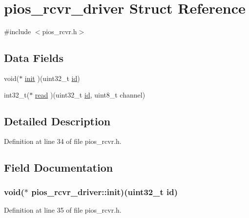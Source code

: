 \hypertarget{structpios__rcvr__driver}{\section{pios\-\_\-rcvr\-\_\-driver \-Struct \-Reference}
\label{structpios__rcvr__driver}
}


{\ttfamily \#include $<$pios\-\_\-rcvr.\-h$>$}

\subsection*{\-Data \-Fields}
\begin{DoxyCompactItemize}
\item 
void($\ast$ \hyperlink{structpios__rcvr__driver_a9408f58f021157271f50346eb77b4e6c}{init} )(uint32\-\_\-t \hyperlink{uavobjectmanager_8c_abaabdc509cdaba7df9f56c6c76f3ae19}{id})
\item 
int32\-\_\-t($\ast$ \hyperlink{structpios__rcvr__driver_aece490b76542b52a499fe333f933372e}{read} )(uint32\-\_\-t \hyperlink{uavobjectmanager_8c_abaabdc509cdaba7df9f56c6c76f3ae19}{id}, uint8\-\_\-t channel)
\end{DoxyCompactItemize}


\subsection{\-Detailed \-Description}


\-Definition at line 34 of file pios\-\_\-rcvr.\-h.



\subsection{\-Field \-Documentation}
\hypertarget{structpios__rcvr__driver_a9408f58f021157271f50346eb77b4e6c}{
\subsubsection[{init}]{\setlength{\rightskip}{0pt plus 5cm}void($\ast$ {\bf pios\-\_\-rcvr\-\_\-driver\-::init})(uint32\-\_\-t {\bf id})}}\label{structpios__rcvr__driver_a9408f58f021157271f50346eb77b4e6c}


\-Definition at line 35 of file pios\-\_\-rcvr.\-h.

